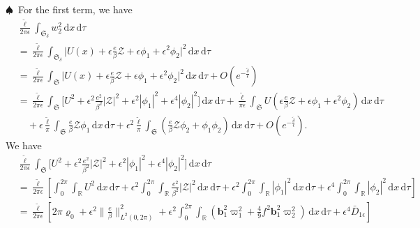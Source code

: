\documentclass[10pt, reqno]{amsart}
\numberwithin{equation}{section}
\theoremstyle{definition}
\begin{document}
{\smallskip
\noindent $\spadesuit$\
For the first term, we have
\begin{align*}
 & \frac {\tilde \ell} {2\pi \epsilon} \int_{{\mathfrak S}_\delta} w_2^2 \, {\mathrm d} x \,{\mathrm d}\tau
\nonumber\\[2mm]
 &
 = \frac {\tilde \ell} {2\pi \epsilon} \int_{{\mathfrak S}_\delta} \big|U(x) + \epsilon \frac e\beta \mathcal Z + \epsilon \phi_1 + \epsilon^2\phi_2 \big|^2\, {\mathrm d} x \,{\mathrm d}\tau
 \nonumber\\[2mm]
 &
 = \frac {\tilde \ell} {2\pi \epsilon} \int_{{\mathfrak S}} \big|U(x) + \epsilon \frac e\beta \mathcal Z + \epsilon \phi_1 + \epsilon^2\phi_2 \big|^2\, {\mathrm d} x \,{\mathrm d}\tau
  +O\left(e^{-\frac{\tilde \delta}\epsilon} \right)
\nonumber\\[2mm]
 &
 = \frac {\tilde \ell} {2\pi \epsilon} \int_{{\mathfrak S}}
\Big[ U^2 + \epsilon^2\frac{e^2}{\beta^2}|\mathcal Z|^2 + \epsilon^2|\phi_1|^2+ \epsilon^4|\phi_2|^2\Big]\, {\mathrm d} x \,{\mathrm d}\tau
 + \frac {\tilde \ell} {\pi \epsilon} \int_{{\mathfrak S}} U \left(\epsilon \frac e\beta \mathcal Z + \epsilon \phi_1 + \epsilon^2\phi_2 \right)\, {\mathrm d} x \,{\mathrm d}\tau
\nonumber\\[2mm]
 &
 \quad
 +\epsilon\frac {\tilde \ell} {\pi} \int_{{\mathfrak S}} \frac e\beta \mathcal Z \phi_1\, {\mathrm d} x \,{\mathrm d}\tau
 + \epsilon^2\frac {\tilde \ell} {\pi} \int_{{\mathfrak S}}\left(\frac e\beta \mathcal Z \phi_2 + \phi_1 \phi_2 \right) \, {\mathrm d} x \,{\mathrm d}\tau
 +O\left(e^{-\frac{\tilde \delta}\epsilon} \right).
\end{align*}
 We have
\begin{align*}
 & \frac {\tilde \ell} {2\pi \epsilon} \int_{{\mathfrak S}}
\Big[U^2 + \epsilon^2 \frac{e^2}{\beta^2}|\mathcal Z|^2 + \epsilon^2|\phi_1|^2+ \epsilon^4|\phi_2|^2\Big]\, {\mathrm d} x \,{\mathrm d}\tau
\nonumber\\[2mm]
 & = \frac {\tilde \ell} {2\pi \epsilon} \left[ \int_0^{2\pi} \int_{\mathbb R} U^2 \, {\mathrm d} x \,{\mathrm d}\tau
 + \epsilon^2 \int_0^{2\pi} \int_{\mathbb R} \frac{e^2}{\beta^2} |\mathcal Z|^2 \, {\mathrm d} x \,{\mathrm d}\tau
 + \epsilon^2 \int_0^{2\pi} \int_{\mathbb R} |\phi_1|^2 \, {\mathrm d} x \,{\mathrm d}\tau + \epsilon^4 \int_0^{2\pi} \int_{\mathbb R} |\phi_2|^2 \, {\mathrm d} x \,{\mathrm d}\tau \right]
\nonumber\\[2mm]
& =
 \frac {\tilde \ell} {2\pi \epsilon} \left[ 2\pi \varrho_0 + \epsilon^2 \Big\|\frac e\beta \Big\|^2_{L^2(0, 2\pi)} + \epsilon^2 \int_0^{2\pi} \int_{\mathbb R} \left( {\mathbf b}_1^2\varpi_1^2+ \frac49f^2 {\mathbf b}_1^2\varpi_2^2 \right) \, {\mathrm d} x \,{\mathrm d}\tau + \epsilon^4 \bar{D}_{1\epsilon} \right]

\end{align*}}
\end{document}
